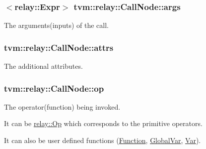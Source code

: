 \subsubsection[{\texorpdfstring{args}{args}}]{$<${\bf relay\+::\+Expr}$>$ tvm\+::relay\+::\+Call\+Node\+::args}\hypertarget{classtvm_1_1relay_1_1CallNode_a7b2ba771babac0a99e2909227d35c092}{}\label{classtvm_1_1relay_1_1CallNode_a7b2ba771babac0a99e2909227d35c092}


The arguments(inputs) of the call. 

\subsubsection[{\texorpdfstring{attrs}{attrs}}]{ tvm\+::relay\+::\+Call\+Node\+::attrs}\hypertarget{classtvm_1_1relay_1_1CallNode_ac9d1656e2a9fda49049186c3aa3eb208}{}\label{classtvm_1_1relay_1_1CallNode_ac9d1656e2a9fda49049186c3aa3eb208}


The additional attributes. 

\subsubsection[{\texorpdfstring{op}{op}}]{ tvm\+::relay\+::\+Call\+Node\+::op}\hypertarget{classtvm_1_1relay_1_1CallNode_ade66944f5a2f064e4eb07ad9f9438306}{}\label{classtvm_1_1relay_1_1CallNode_ade66944f5a2f064e4eb07ad9f9438306}


The operator(function) being invoked. 


\begin{DoxyItemize}
\item It can be \hyperlink{namespacetvm_1_1relay_a6c46d15e80f1a9916b8e9c264a185c98}{relay\+::\+Op} which corresponds to the primitive operators.
\item It can also be user defined functions (\hyperlink{classtvm_1_1relay_1_1Function}{Function}, \hyperlink{classtvm_1_1GlobalVar}{Global\+Var}, \hyperlink{classtvm_1_1relay_1_1Var}{Var}). 
\end{DoxyItemize}
